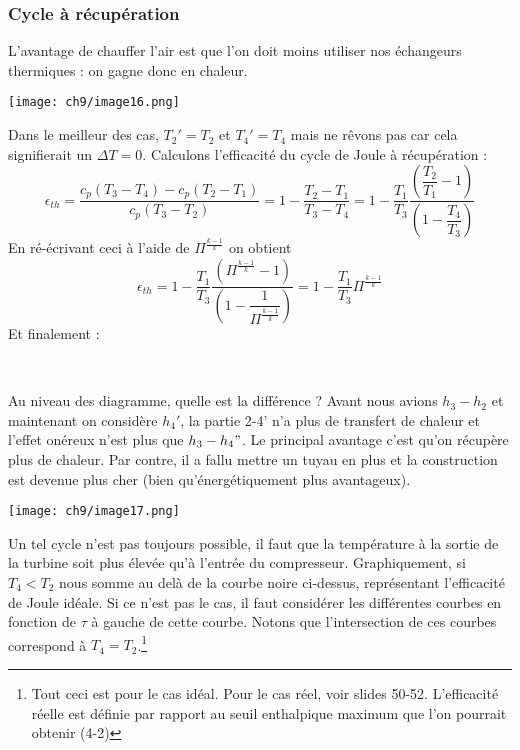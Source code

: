 		
		\subsubsection{Cycle à récupération}
		L'avantage de chauffer l'air est que l'on doit moins utiliser nos échangeurs 
		thermiques : on gagne donc en chaleur. 
		\begin{center}
		\texttt{[image: ch9/image16.png]}
		\end{center}	
		Dans le meilleur des cas, $T_2'=T_2$ et $T_4'=T_4$ mais ne rêvons pas car cela 
		signifierait un $\Delta T=0$. Calculons l'efficacité du cycle de Joule à 
		récupération :
		\begin{equation}
		\epsilon_{th} = \dfrac{c_p(T_3-T_4)-c_p(T_2-T_1)}{c_p(T_3-T_2)} = 1-\dfrac{T_2-T_1}{
		T_3-T_4} = 1-\dfrac{T_1}{T_3}\dfrac{\left(\dfrac{T_2}{T_1}-1\right)}{\left(1-
		\dfrac{T_4}{T_3}\right)}
		\end{equation}
		En ré-écrivant ceci à l'aide de $\Pi^{\frac{k-1}{k}}$ on obtient
		\begin{equation}
		\epsilon_{th} = 1-\dfrac{T_1}{T_3}\dfrac{\left(\Pi^{\frac{k-1}{k}}-1 \right)}{\left( 
		1-\dfrac{1}{\Pi^{\frac{k-1}{k}}}\right)} = 1-\dfrac{T_1}{T_3}\Pi^{\frac{k-1}{k}}
		\end{equation}
		Et finalement : 
		
		\ 
		
		Au niveau des diagramme, quelle est la différence ? Avant nous avions $h_3-h_2$ 
		et maintenant on considère $h_4'$, la partie 2-4' n'a plus de transfert de 
		chaleur et l'effet onéreux n'est plus que $h_3-h_4"$. Le principal avantage 
		c'est qu'on récupère plus de chaleur. Par contre, il a fallu mettre un tuyau 
		en plus et la construction est devenue plus cher (bien qu'énergétiquement plus 
		avantageux).

		\begin{center}
		\texttt{[image: ch9/image17.png]}
		\end{center}			
		
		Un tel cycle n'est pas toujours possible, il faut que la température à la  sortie 
		de la turbine soit plus élevée qu'à l'entrée du compresseur. Graphiquement, si 
		$T_4<T_2$ nous somme au delà de la courbe noire ci-dessus, représentant 
		l'efficacité de Joule idéale. Si ce n'est pas le cas, il faut considérer les 
		différentes courbes en fonction de $\tau$ à gauche de cette courbe. Notons que 
		l'intersection de ces courbes correspond à $T_4=T_2$.\footnote{Tout ceci est pour 
		le cas idéal. Pour le cas réel, voir slides 50-52. L'efficacité réelle est définie 
		par rapport au seuil enthalpique maximum que l'on pourrait obtenir (4-2)}
		
